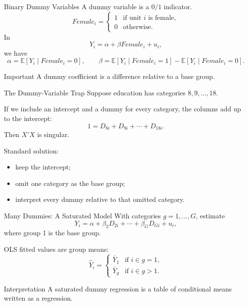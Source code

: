 \documentclass[11pt,aspectratio=169]{beamer}
\newcommand{\E}{\mathbb{E}}
\newcommand{\derivbutton}[1]{\vspace{0.4em}\hfill\hyperlink{app:#1}{\beamerbutton{Appendix details}}}
\begin{document}
\begin{frame}{Binary Dummy Variables}
  A dummy variable is a \(0/1\) indicator.
  \[
    Female_i =
    \begin{cases}
      1 & \text{if unit } i \text{ is female},\\
      0 & \text{otherwise}.
    \end{cases}
  \]
  In
  \[
    Y_i=\alpha+\beta Female_i+u_i,
  \]
  we have
  \[
    \alpha=\E[Y_i\mid Female_i=0],
    \qquad
    \beta=\E[Y_i\mid Female_i=1]-\E[Y_i\mid Female_i=0].
  \]
  \begin{block}{Important}
    A dummy coefficient is a difference relative to a base group.
  \end{block}
\end{frame}

\begin{frame}{The Dummy-Variable Trap}
  Suppose education has categories \(8,9,\ldots,18\).
  \vspace{0.3em}

  If we include an intercept and a dummy for every category, the columns add up to the intercept:
  \[
    1 = D_{8i}+D_{9i}+\cdots+D_{18i}.
  \]
  Then \(X'X\) is singular.
  \vspace{0.3em}

  Standard solution:
  \begin{itemize}
    \item keep the intercept;
    \item omit one category as the base group;
    \item interpret every dummy relative to that omitted category.
  \end{itemize}
\end{frame}

\begin{frame}{Many Dummies: A Saturated Model}
  \hypertarget{main:dummy-means}{}
  With categories \(g=1,\ldots,G\), estimate
  \[
    Y_i=\alpha+\beta_2D_{2i}+\cdots+\beta_GD_{Gi}+u_i,
  \]
  where group 1 is the base group.
  \vspace{0.3em}

  OLS fitted values are group means:
  \[
    \widehat{Y}_i=
    \begin{cases}
      \bar Y_1 & \text{if } i\in g=1,\\
      \bar Y_g & \text{if } i\in g>1.
    \end{cases}
  \]
  \begin{block}{Interpretation}
    A saturated dummy regression is a table of conditional means written as a regression.
  \end{block}
  \derivbutton{dummy-means}
\end{frame}
\end{document}
